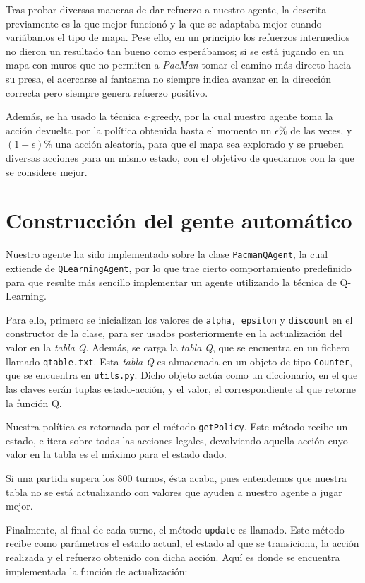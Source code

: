 \documentclass[12pt]{article}
\begin{document}
Tras probar diversas maneras de dar refuerzo a nuestro agente, la descrita previamente es la que mejor funcionó y la que se adaptaba mejor cuando variábamos el tipo de mapa. Pese ello, en un principio los refuerzos intermedios no dieron un resultado tan bueno como esperábamos; si se está jugando en un mapa con muros que no permiten a \textit{PacMan} tomar el camino más directo hacia su presa, el acercarse al fantasma no siempre indica avanzar en la dirección correcta pero siempre genera refuerzo positivo.

Además, se ha usado la técnica $\epsilon$-greedy, por la cual nuestro agente toma la acción devuelta por la política obtenida hasta el momento un $\epsilon\%$ de las veces, y $(1-\epsilon)\%$ una acción aleatoria, para que el mapa sea explorado y se prueben diversas acciones para un mismo estado, con el objetivo de quedarnos con la que se considere mejor.

\newpage
\section{Construcción del gente automático}

Nuestro agente ha sido implementado sobre la clase \texttt{PacmanQAgent}, la cual extiende de \texttt{QLearningAgent}, por lo que trae cierto comportamiento predefinido para que resulte más sencillo implementar un agente utilizando la técnica de Q-Learning.

Para ello, primero se inicializan los valores de \texttt{alpha, epsilon} y \texttt{discount} en el constructor de la clase, para ser usados posteriormente en la actualización del valor en la \textit{tabla Q}. Además, se carga la \textit{tabla Q}, que se encuentra en un fichero llamado \texttt{qtable.txt}. Esta \textit{tabla Q} es almacenada en un objeto de tipo \texttt{Counter}, que se encuentra en \texttt{utils.py}. Dicho objeto actúa como un diccionario, en el que las claves serán tuplas estado-acción, y el valor, el correspondiente al que retorne la función Q.

Nuestra política es retornada por el método \texttt{getPolicy}. Este método recibe un estado, e itera sobre todas las acciones legales, devolviendo aquella acción cuyo valor en la tabla es el máximo para el estado dado.

Si una partida supera los 800 turnos, ésta acaba, pues entendemos que nuestra tabla no se está actualizando con valores que ayuden a nuestro agente a jugar mejor.

Finalmente, al final de cada turno, el método \texttt{update} es llamado. Este método recibe como parámetros el estado actual, el estado al que se transiciona, la acción realizada y el refuerzo obtenido con dicha acción. Aquí es donde se encuentra implementada la función de actualización:
\end{document}
